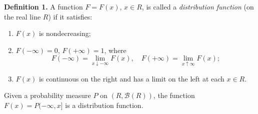 \textbf{Definition 1.} A function $F = F(x)$, $x \in R$, is called a \textit{distribution function} (on the real line $R$) if it satisfies:

\begin{enumerate}
\item[(i)] $F(x)$ is nondecreasing;
\item[(ii)] $F(-\infty) = 0$, $F(+\infty) = 1$, where
$$F(-\infty) = \lim_{x \downarrow -\infty} F(x), \quad F(+\infty) = \lim_{x \uparrow \infty} F(x);$$
\item[(iii)] $F(x)$ is continuous on the right and has a limit on the left at each $x \in R$.
\end{enumerate}

Given a probability measure $P$ on $(R, \mathcal{B}(R))$, the function $F(x) = P(-\infty, x]$ is a distribution function.
